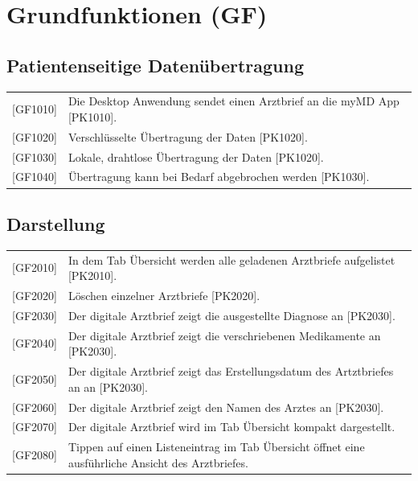 \documentclass[a4paper]{scrreprt}
\begin{document}
\section{Grundfunktionen (GF)}
\subsection{Patientenseitige Datenübertragung}
\begin{tabular}{lll}
[GF1010]&  \multicolumn{2}{p{12cm}}{Die \gls{Desktop Anwendung} sendet einen Arztbrief an die myMD \gls{App} [PK1010].}\\
{[GF1020]} &  \multicolumn{2}{p{12cm}}{Verschlüsselte Übertragung der Daten [PK1020].}  \\
{[GF1030]} &  \multicolumn{2}{p{12cm}}{Lokale, drahtlose Übertragung der Daten [PK1020].}  \\
{[GF1040]} &  \multicolumn{2}{p{12cm}}{Übertragung kann bei Bedarf abgebrochen werden [PK1030].}  \\
\end{tabular}

\subsection{Darstellung}
\begin{tabular}{lll}
{[GF2010]}&  \multicolumn{2}{p{12cm}}{In dem Tab Übersicht werden alle geladenen Arztbriefe aufgelistet [PK2010].} \\
{[GF2020]} &  \multicolumn{2}{p{12cm}}{Löschen einzelner Arztbriefe [PK2020].}  \\
{[GF2030]} &  \multicolumn{2}{p{12cm}}{Der digitale Arztbrief zeigt die ausgestellte Diagnose an [PK2030].}  \\
{[GF2040]} &  \multicolumn{2}{p{12cm}}{Der digitale Arztbrief zeigt die verschriebenen Medikamente an [PK2030].}  \\
{[GF2050]} &  \multicolumn{2}{p{12cm}}{Der digitale Arztbrief zeigt das Erstellungsdatum des Artztbriefes an an [PK2030].}  \\
{[GF2060]} &  \multicolumn{2}{p{12cm}}{Der digitale Arztbrief zeigt den Namen des Arztes an [PK2030].}  \\
{[GF2070]} &  \multicolumn{2}{p{12cm}}{Der digitale Arztbrief wird im Tab Übersicht kompakt dargestellt.}  \\
{[GF2080]} &  \multicolumn{2}{p{12cm}}{Tippen auf einen Listeneintrag im Tab Übersicht öffnet eine ausführliche Ansicht des Arztbriefes.}  \\
\end{tabular}
\end{document}
